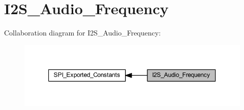 \hypertarget{group___i2_s___audio___frequency}{}\section{I2\+S\+\_\+\+Audio\+\_\+\+Frequency}
\label{group___i2_s___audio___frequency}
Collaboration diagram for I2\+S\+\_\+\+Audio\+\_\+\+Frequency\+:
\nopagebreak
\begin{figure}[H]
\begin{center}
\leavevmode
\includegraphics[width=350pt]{group___i2_s___audio___frequency}
\end{center}
\end{figure}
